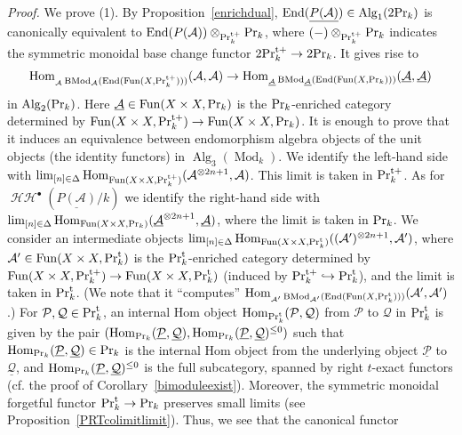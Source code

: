 \documentclass[leqno,12pt]{amsart}
\theoremstyle{plain}
\theoremstyle{definition}
\newcommand{\HH}{\operatorname{\mathcal{HH}}}
\newcommand{\AAA}{\mathcal{A}}
\newcommand{\PR}{\textup{Pr}}
\newcommand{\PRT}{\textup{Pr}^{\textup{t}}}
\newcommand{\PRTT}{\textup{Pr}^{\textup{t}+}}
\newcommand{\Hom}{\operatorname{Hom}}
\newcommand{\Mod}{\operatorname{Mod}}
\newcommand{\Fun}{\operatorname{Fun}}
\newcommand{\Alg}{\operatorname{Alg}}
\newcommand{\End}{\operatorname{End}}
\newcommand{\BMod}{\operatorname{BMod}}
\newcommand{\Proof}{{\sl Proof.}\quad}
\begin{document}
\Proof
We prove (1).
By Proposition~\ref{enrichdual}, 
$\End(\underline{P(\AAA)})\in \Alg_1(2\PR_k)$
is canonically equivalent to $\End(P(\AAA))\otimes_{\PRTT_k}\PR_k$, where 
$(-)\otimes_{\PRTT_k}\PR_k$ indicates the symmetric monoidal base change functor $2\PRTT_k\to 2\PR_k$.
It gives rise to
\[
\Hom_{{}_{\mathcal{A}}\BMod_{\mathcal{A}}(\End(\Fun(X,\PRTT_k)))}(\mathcal{A},\mathcal{A})\to \Hom_{{}_{\underline{\mathcal{A}}}\BMod_{\underline{\mathcal{A}}}(\End(\Fun(X,\PR_k)))}(\underline{\mathcal{A}},\underline{\mathcal{A}})
\]
in $\Alg_2(\PR_k)$. Here $\underline{\AAA}\in \Fun(X\times X,\PR_k)$ is the $\PR_k$-enriched category determined by $\Fun(X\times X,\PRTT_k)\to \Fun(X\times X,\PR_k)$.
It is enough to prove that it induces an equivalence between endomorphism algebra objects of the unit objects (the identity functors) in $\Alg_3(\Mod_k)$.
We identify the left-hand side with
$\lim_{[n]\in \Delta}\Hom_{\Fun(X\times X,\PRTT_k)}( \mathcal{A}^{\otimes 2n+1},\mathcal{A})$. This limit is taken in $\PRTT_k$.
As for $\HH^\bullet(\underline{P(\AAA)}/k)$
we identify the right-hand side with $\lim_{[n]\in \Delta}\Hom_{\Fun(X\times X,\PR_k)}( \underline{\mathcal{A}}^{\otimes 2n+1},\underline{\mathcal{A}})$,
where the limit is taken in $\PR_k$.
We consider an intermediate objects $\lim_{[n]\in \Delta}\Hom_{\Fun(X\times X,\PRT_k)}( (\mathcal{A}')^{\otimes 2n+1},\mathcal{A}')$,
where $\AAA'\in \Fun(X\times X,\PRT_k)$ is the $\PRT_k$-enriched category determined by $\Fun(X\times X,\PRTT_k)\to \Fun(X\times X,\PRT_k)$ (induced by $\PRTT_k\hookrightarrow \PRT_k$),
and the limit is taken in $\PRT_k$. (We note that it ``computes'' $\Hom_{{}_{\mathcal{A}'}\BMod_{\mathcal{A}'}(\End(\Fun(X,\PRT_k)))}(\mathcal{A}',\mathcal{A}')$.)
For $\mathcal{P}, \mathcal{Q}\in \PRT_k$, an internal Hom object $\Hom_{\PRT_k}(\mathcal{P},\mathcal{Q})$ from $\mathcal{P}$ to $\mathcal{Q}$ in $\PRT_k$ is 
given  by the pair $(\Hom_{\PR_k}(\underline{\mathcal{P}},\underline{\mathcal{Q}}), \Hom_{\PR_k}(\underline{\mathcal{P}},\underline{\mathcal{Q}})^{\le0})$
such that $\Hom_{\PR_k}(\underline{\mathcal{P}},\underline{\mathcal{Q}})\in \PR_k$ 
is the internal Hom object from the underlying object $\underline{\mathcal{P}}$ to $\underline{\mathcal{Q}}$, and 
 $\Hom_{\PR_k}(\underline{\mathcal{P}},\underline{\mathcal{Q}})^{\le0}$ is the full subcategory, spanned by right $t$-exact functors (cf. the proof of Corollary~\ref{bimoduleexist}).
Moreover, the symmetric monoidal forgetful functor $\PRT_k\to \PR_k$ preserves small limits (see Proposition~\ref{PRTcolimitlimit}). Thus, we see that the canonical functor  
\end{document}
